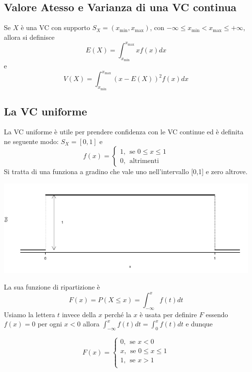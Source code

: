 \documentclass[
  11pt,
]{book}
\theoremstyle{mytheoremstyle}
\theoremstyle{mydefstyle}
\begin{document}
\subsection{Valore Atesso e Varianza di una VC continua}\label{valore-atesso-e-varianza-di-una-vc-continua}

Se \(X\) è una VC con supporto \(S_X=(x_{\min},x_{\max})\), con \(-\infty \le x_{\min} < x_{\max} \le +\infty\), allora si definisce
\[
E(X)=\int_{x_{\min}}^{x_{\max}} x f(x)dx
\]
e
\[
V(X)=\int_{x_{\min}}^{x_{\max}} (x-E(X))^2 f(x)dx
\]

\subsection{La VC uniforme}\label{la-vc-uniforme}

La VC uniforme è utile per prendere confidenza con le VC continue ed è definita
ne seguente modo: \(S_X=[0,1]\) e
\[
f(x)= 
\begin{cases}
  1,~~\text{se $0\le x \leq 1$}\\
  0,~~\text{altrimenti}
\end{cases}
\]
Si tratta di una funziona a gradino che vale uno nell'intervallo {[}0,1{]} e zero altrove.

\begin{center}\includegraphics{Appunti_di_Statistica_2025_files/figure-latex/06-unif1-1} \end{center}

La sua funzione di ripartizione è
\[
F(x) = P(X\leq x) = \int_{-\infty}^{x} f(t)dt
\]
Usiamo la lettera \(t\) invece della \(x\) perché la \(x\) è usata per definire \(F\)
essendo \(f(x)=0\) per ogni \(x<0\) allora \(\int_{-\infty}^x f(t)dt=\int_0^x f(t)dt\) e dunque

\[
F(x)=\begin{cases}
0,~~\text{se $x<0$}\\
x,~~\text{se $0\leq x \leq 1$}\\
1,~~\text{se $x>1$}\\
\end{cases}
\]
\end{document}
